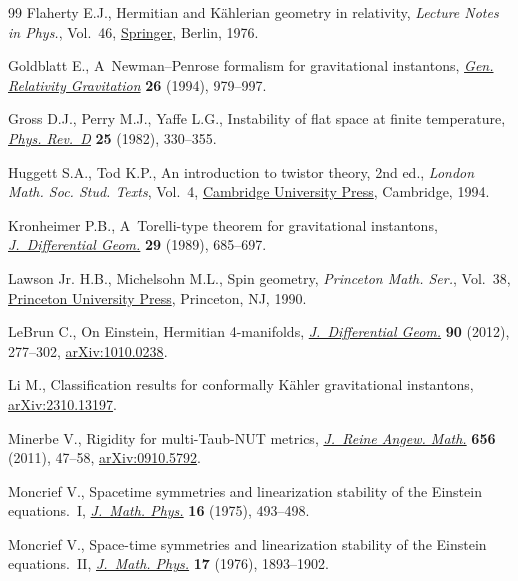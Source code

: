 \documentclass[10pt,a4paper]{amsart}
\numberwithin{equation}{section}
\begin{document}
\begin{thebibliography}{99}
Flaherty E.J., Hermitian and {K}\"ahlerian geometry in relativity,
 \textit{Lecture Notes in Phys.}, Vol.~46, \href{https://doi.org/10.1007/3-540-07540-2}{Springer}, Berlin, 1976.

Goldblatt E., A~{N}ewman--{P}enrose formalism for gravitational instantons,
 \href{https://doi.org/10.1007/BF02106666}{\textit{Gen. Relativity Gravitation}} \textbf{26} (1994), 979--997.

Gross D.J., Perry M.J., Yaffe L.G., Instability of flat space at finite
 temperature, \href{https://doi.org/10.1103/PhysRevD.25.330}{\textit{Phys. Rev.~D}} \textbf{25} (1982), 330--355.

Huggett S.A., Tod K.P., An introduction to twistor theory, 2nd ed., \textit{London Math.
 Soc. Stud. Texts}, Vol.~4, \href{https://doi.org/10.1017/CBO9780511624018}{Cambridge University Press}, Cambridge,
 1994.

Kronheimer P.B., A~{T}orelli-type theorem for gravitational instantons,
 \href{https://doi.org/10.4310/jdg/1214443067}{\textit{J.~Differential Geom.}} \textbf{29} (1989), 685--697.

Lawson Jr. H.B., Michelsohn M.L., Spin geometry, \textit{Princeton Math. Ser.},
 Vol.~38, \href{https://doi.org/10.1515/9781400883912}{Princeton University Press}, Princeton, NJ, 1990.

LeBrun C., On {E}instein, {H}ermitian 4-manifolds, \href{https://doi.org/10.4310/jdg/1335230848}{\textit{J.~Differential
 Geom.}} \textbf{90} (2012), 277--302, \href{https://arxiv.org/abs/1010.0238}{arXiv:1010.0238}.

Li M., Classification results for conformally {K}\"ahler gravitational
 instantons, \href{https://arxiv.org/abs/2310.13197}{arXiv:2310.13197}.

Minerbe V., Rigidity for multi-{T}aub-{NUT} metrics, \href{https://doi.org/10.1515/CRELLE.2011.042}{\textit{J.~Reine Angew.
 Math.}} \textbf{656} (2011), 47--58, \href{https://arxiv.org/abs/0910.5792}{arXiv:0910.5792}.

Moncrief V., Spacetime symmetries and linearization stability of the {E}instein
 equations.~{I}, \href{https://doi.org/10.1063/1.522572}{\textit{J.~Math. Phys.}} \textbf{16} (1975), 493--498.

Moncrief V., Space-time symmetries and linearization stability of the
 {E}instein equations.~{II}, \href{https://doi.org/10.1063/1.522814}{\textit{J.~Math. Phys.}} \textbf{17} (1976),
 1893--1902.


\end{thebibliography}
\end{document}
